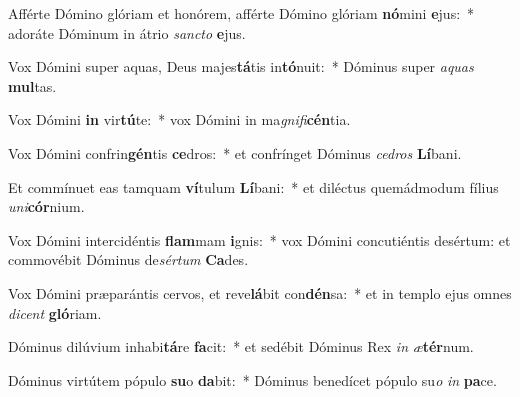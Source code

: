 \item Afférte Dómino glóriam et honórem, afférte Dómino glóriam \textbf{nó}mini \textbf{e}jus:~* adoráte Dóminum in átrio \textit{sanc}\textit{to} \textbf{e}jus.
\item Vox Dómini super aquas, Deus majes\textbf{tá}tis in\textbf{tó}nuit:~* Dóminus super \textit{a}\textit{quas} \textbf{mul}tas.
\item Vox Dómini \textbf{in} vir\textbf{tú}te:~* vox Dómini in ma\textit{gni}\textit{fi}\textbf{cén}tia.
\item Vox Dómini confrin\textbf{gén}tis \textbf{ce}dros:~* et confrínget Dóminus \textit{ce}\textit{dros} \textbf{Lí}bani.
\item Et commínuet eas tamquam \textbf{ví}tulum \textbf{Lí}bani:~* et diléctus quemádmodum fílius \textit{u}\textit{ni}\textbf{cór}nium.
\item Vox Dómini intercidéntis \textbf{flam}mam \textbf{i}gnis:~* vox Dómini concutiéntis desértum: et commovébit Dóminus de\textit{sér}\textit{tum} \textbf{Ca}des.
\item Vox Dómini præparántis cervos, et reve\textbf{lá}bit con\textbf{dén}sa:~* et in templo ejus omnes \textit{di}\textit{cent} \textbf{gló}riam.
\item Dóminus dilúvium inhabi\textbf{tá}re \textbf{fa}cit:~* et sedébit Dóminus Rex \textit{in} \textit{æ}\textbf{tér}num.
\item Dóminus virtútem pópulo \textbf{su}o \textbf{da}bit:~* Dóminus benedícet pópulo su\textit{o} \textit{in} \textbf{pa}ce.

